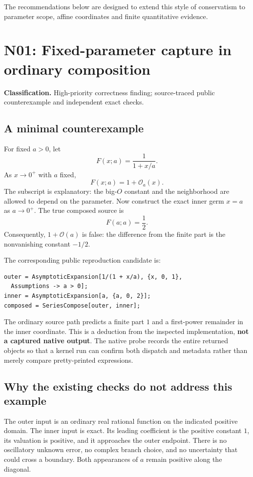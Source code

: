 \documentclass[11pt,a4paper]{article}
\newcommand{\OO}{\mathcal O}
\newcommand{\finding}[3]{\section{#1: #2}\label{sec:#1}\textbf{Classification.} #3\par}
\begin{document}
The recommendations below are designed to extend this style of conservatism to parameter scope, affine coordinates and finite quantitative evidence.

\finding{N01}{Fixed-parameter capture in ordinary composition}{High-priority correctness finding; source-traced public counterexample and independent exact checks.}

\subsection{A minimal counterexample}

For fixed $a>0$, let
\begin{equation}\label{eq:capture-source}
 F(x;a)=\frac{1}{1+x/a}.
\end{equation}
As $x\to0^+$ with $a$ fixed,
\begin{equation}\label{eq:capture-outer}
 F(x;a)=1+\OO_a(x).
\end{equation}
The subscript is explanatory: the big-$O$ constant and the neighborhood are allowed to depend on the parameter. Now construct the exact inner germ $x=a$ as $a\to0^+$. The true composed source is
\begin{equation}\label{eq:capture-diagonal}
 F(a;a)=\frac12.
\end{equation}
Consequently, $1+\OO(a)$ is false: the difference from the finite part is the nonvanishing constant $-1/2$.

The corresponding public reproduction candidate is:
\begin{lstlisting}
outer = AsymptoticExpansion[1/(1 + x/a), {x, 0, 1},
  Assumptions -> a > 0];
inner = AsymptoticExpansion[a, {a, 0, 2}];
composed = SeriesCompose[outer, inner];
\end{lstlisting}
The ordinary source path predicts a finite part $1$ and a first-power remainder in the inner coordinate. This is a deduction from the inspected implementation, \textbf{not a captured native output}. The native probe records the entire returned objects so that a kernel run can confirm both dispatch and metadata rather than merely compare pretty-printed expressions.\cite{operations,core}

\subsection{Why the existing checks do not address this example}

The outer input is an ordinary real rational function on the indicated positive domain. The inner input is exact. Its leading coefficient is the positive constant $1$, its valuation is positive, and it approaches the outer endpoint. There is no oscillatory unknown error, no complex branch choice, and no uncertainty that could cross a boundary. Both appearances of $a$ remain positive along the diagonal.
\end{document}

